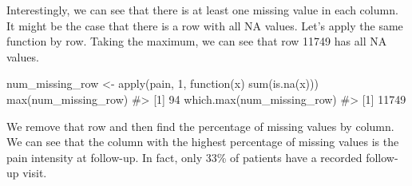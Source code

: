\documentclass[
  letterpaper,
]{krantz}
\makeatletter
\newenvironment{Shaded}{\begin{snugshade}}{\end{snugshade}}
\newcommand{\CommentTok}[1]{\textcolor[rgb]{0.37,0.37,0.37}{#1}}
\newcommand{\ControlFlowTok}[1]{\textcolor[rgb]{0.00,0.23,0.31}{#1}}
\newcommand{\DecValTok}[1]{\textcolor[rgb]{0.68,0.00,0.00}{#1}}
\newcommand{\FunctionTok}[1]{\textcolor[rgb]{0.28,0.35,0.67}{#1}}
\newcommand{\NormalTok}[1]{\textcolor[rgb]{0.00,0.23,0.31}{#1}}
\newcommand{\OtherTok}[1]{\textcolor[rgb]{0.00,0.23,0.31}{#1}}
\newenvironment{kframe}{%
\medskip{}
\setlength{\fboxsep}{.8em}
 \def\at@end@of@kframe{}%
 \ifinner\ifhmode%
  \def\at@end@of@kframe{\end{minipage}}%
  \begin{minipage}{\columnwidth}%
 \fi\fi%
 \def\FrameCommand##1{\hskip\@totalleftmargin \hskip-\fboxsep
 \colorbox{shadecolor}{##1}\hskip-\fboxsep
     \hskip-\linewidth \hskip-\@totalleftmargin \hskip\columnwidth}%
 \MakeFramed {\advance\hsize-\width
   \@totalleftmargin\z@ \linewidth\hsize
   \@setminipage}}%
 {\par\unskip\endMakeFramed%
 \at@end@of@kframe}
\renewenvironment{Shaded}{\begin{kframe}}{\end{kframe}}
\makeatother
\begin{document}
Interestingly, we can see that there is at least one missing value in
each column. It might be the case that there is a row with all NA
values. Let's apply the same function by row. Taking the maximum, we can
see that row 11749 has all NA values.

\begin{Shaded}
\begin{Highlighting}[]
\NormalTok{num\_missing\_row }\OtherTok{\textless{}{-}} \FunctionTok{apply}\NormalTok{(pain, }\DecValTok{1}\NormalTok{, }\ControlFlowTok{function}\NormalTok{(x) }\FunctionTok{sum}\NormalTok{(}\FunctionTok{is.na}\NormalTok{(x)))}
\FunctionTok{max}\NormalTok{(num\_missing\_row)}
\CommentTok{\#\textgreater{} [1] 94}
\FunctionTok{which.max}\NormalTok{(num\_missing\_row)}
\CommentTok{\#\textgreater{} [1] 11749}
\end{Highlighting}
\end{Shaded}

We remove that row and then find the percentage of missing values by
column. We can see that the column with the highest percentage of
missing values is the pain intensity at follow-up. In fact, only 33\% of
patients have a recorded follow-up visit.
\end{document}
